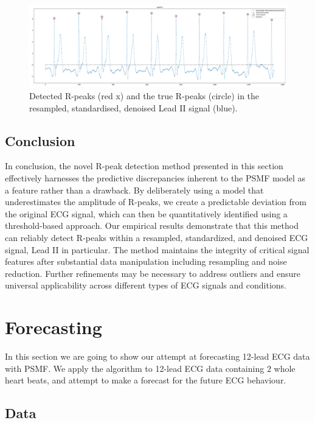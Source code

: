 \documentclass{mldsmsc}
\begin{document}
\begin{figure}[h]
\centering
\includegraphics[width=1\linewidth]{images/r_peaks/resampled_standardised_denoised_ecg_rpeaks_m.pdf}
\caption{Detected R-peaks (red x) and the true R-peaks (circle) in the resampled, standardised, denoised Lead II signal (blue).}
\label{fig:rpeaks-ecg}
\end{figure}

\subsection{Conclusion}

\noindent In conclusion, the novel R-peak detection method presented in this section effectively harnesses the predictive discrepancies inherent to the PSMF model as a feature rather than a drawback. By deliberately using a model that underestimates the amplitude of R-peaks, we create a predictable deviation from the original ECG signal, which can then be quantitatively identified using a threshold-based approach. Our empirical results demonstrate that this method can reliably detect R-peaks within a resampled, standardized, and denoised ECG signal, Lead II in particular. The method maintains the integrity of critical signal features after substantial data manipulation including resampling and noise reduction. Further refinements may be necessary to address outliers and ensure universal applicability across different types of ECG signals and conditions.

\section{Forecasting}

In this section we are going to show our attempt at forecasting 12-lead ECG data with PSMF. We apply the algorithm to 12-lead ECG data containing $2$ whole heart beats, and attempt to make a forecast for the future ECG behaviour.

\subsection{Data}
\end{document}
